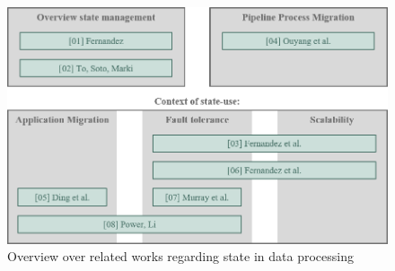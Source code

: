 \begin{figure}[H]
\graphicspath{{./figures/code/}}
\includegraphics[width=\textwidth]{figures/visualizations/RelatedWorksStateManagement_1500.png}
\caption{Overview over related works regarding state in data processing}
\label{fOverviewLiteratureState}
\end{figure}

